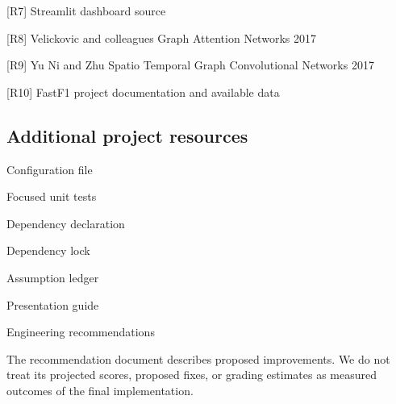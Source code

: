 \documentclass[11pt,a4paper,oneside]{report}
\begin{document}
[R7] Streamlit dashboard source

[R8] Velickovic and colleagues  Graph Attention Networks  2017

[R9] Yu Ni and Zhu  Spatio Temporal Graph Convolutional Networks  2017

[R10] FastF1 project documentation and available data

\subsection*{Additional project resources}

Configuration file

Focused unit tests

Dependency declaration

Dependency lock

Assumption ledger

Presentation guide

Engineering recommendations

The recommendation document describes proposed improvements. We do not treat its projected scores, proposed fixes, or grading estimates as measured outcomes of the final implementation.
\end{document}
